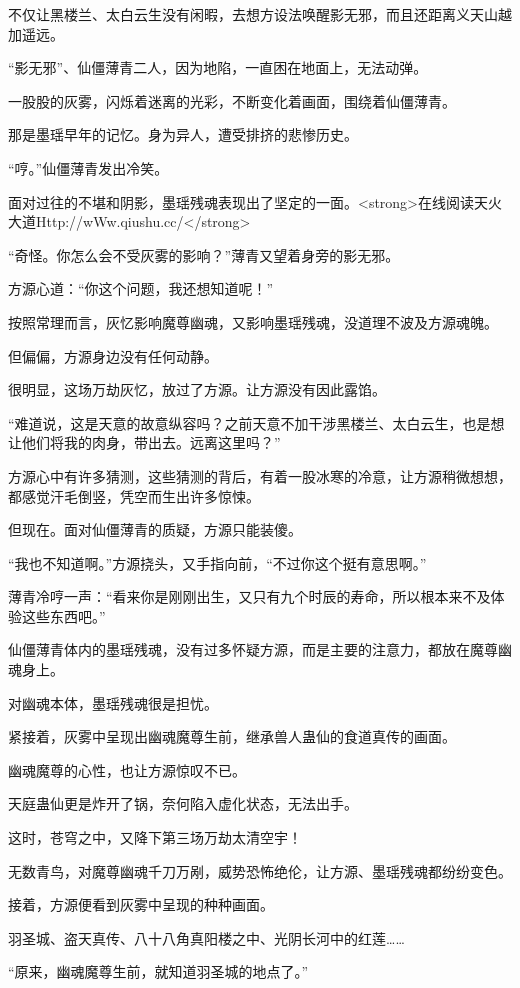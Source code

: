 \begin{this_body}
不仅让黑楼兰、太白云生没有闲暇，去想方设法唤醒影无邪，而且还距离义天山越加遥远。

“影无邪”、仙僵薄青二人，因为地陷，一直困在地面上，无法动弹。

一股股的灰雾，闪烁着迷离的光彩，不断变化着画面，围绕着仙僵薄青。

那是墨瑶早年的记忆。身为异人，遭受排挤的悲惨历史。

“哼。”仙僵薄青发出冷笑。

面对过往的不堪和阴影，墨瑶残魂表现出了坚定的一面。<strong>在线阅读天火大道Http://wWw.qiushu.cc/</strong>

“奇怪。你怎么会不受灰雾的影响？”薄青又望着身旁的影无邪。

方源心道：“你这个问题，我还想知道呢！”

按照常理而言，灰忆影响魔尊幽魂，又影响墨瑶残魂，没道理不波及方源魂魄。

但偏偏，方源身边没有任何动静。

很明显，这场万劫灰忆，放过了方源。让方源没有因此露馅。

“难道说，这是天意的故意纵容吗？之前天意不加干涉黑楼兰、太白云生，也是想让他们将我的肉身，带出去。远离这里吗？”

方源心中有许多猜测，这些猜测的背后，有着一股冰寒的冷意，让方源稍微想想，都感觉汗毛倒竖，凭空而生出许多惊悚。

但现在。面对仙僵薄青的质疑，方源只能装傻。

“我也不知道啊。”方源挠头，又手指向前，“不过你这个挺有意思啊。”

薄青冷哼一声：“看来你是刚刚出生，又只有九个时辰的寿命，所以根本来不及体验这些东西吧。”

仙僵薄青体内的墨瑶残魂，没有过多怀疑方源，而是主要的注意力，都放在魔尊幽魂身上。

对幽魂本体，墨瑶残魂很是担忧。

紧接着，灰雾中呈现出幽魂魔尊生前，继承兽人蛊仙的食道真传的画面。

幽魂魔尊的心性，也让方源惊叹不已。

天庭蛊仙更是炸开了锅，奈何陷入虚化状态，无法出手。

这时，苍穹之中，又降下第三场万劫太清空宇！

无数青鸟，对魔尊幽魂千刀万剐，威势恐怖绝伦，让方源、墨瑶残魂都纷纷变色。

接着，方源便看到灰雾中呈现的种种画面。

羽圣城、盗天真传、八十八角真阳楼之中、光阴长河中的红莲……

“原来，幽魂魔尊生前，就知道羽圣城的地点了。”


\end{this_body}
